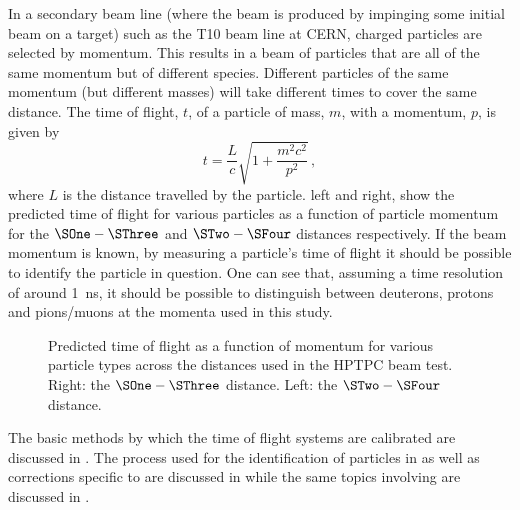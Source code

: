 In a secondary beam line (where the beam is produced by impinging some initial beam on a target) such as the T10 beam line at CERN, charged particles are selected by momentum.
This results in a beam of particles that are all of the same momentum but of different species.
Different particles of the same momentum (but different masses) will take different times to cover the same distance.
The time of flight, $t$, of a particle of mass, $m$, with a momentum, $p$, is given by
\begin{equation}
  t = \frac{L}{c} \sqrt{ 1 + \frac{m^{2}c^{2}}{p^{2}} }\, ,
  \label{eq:tof}
\end{equation}
where $L$ is the distance travelled by the particle.
 left and right, show the predicted time of flight for various particles as a function of particle momentum for the $\SOne - \SThree$ and  $\STwo - \SFour$ distances respectively.
If the beam momentum is known, by measuring a particle's time of flight it should be possible to identify the particle in question.
One can see that, assuming a time resolution of around \SI{1}{\nano\second}, it should be possible to distinguish between deuterons, protons and pions/muons at the momenta used in this study.

\begin{figure}[h]
  \begin{minipage}[t]{.5\linewidth}
    \begin{adjustbox}{max totalsize=\textwidth, center}
      
    \end{adjustbox}
  \end{minipage}
  \hfill
  \begin{minipage}[t]{.5\linewidth}
    \begin{adjustbox}{max totalsize=\textwidth, center}
      
    \end{adjustbox}
  \end{minipage}
  \caption[Predicted time of flight as a function of momentum for various particle types across the distances used in the HPTPC beam test]{Predicted time of flight as a function of momentum for various particle types across the distances used in the HPTPC beam test. Right: the $\SOne - \SThree$ distance. Left: the $\STwo - \SFour$ distance.}
  \label{fig:tofVsMom}
\end{figure}

The basic methods by which the time of flight systems are calibrated are discussed in .
The process used for the identification of particles in \SThree as well as corrections specific to \SThree are discussed in  while the same topics involving \SFour are discussed in .

